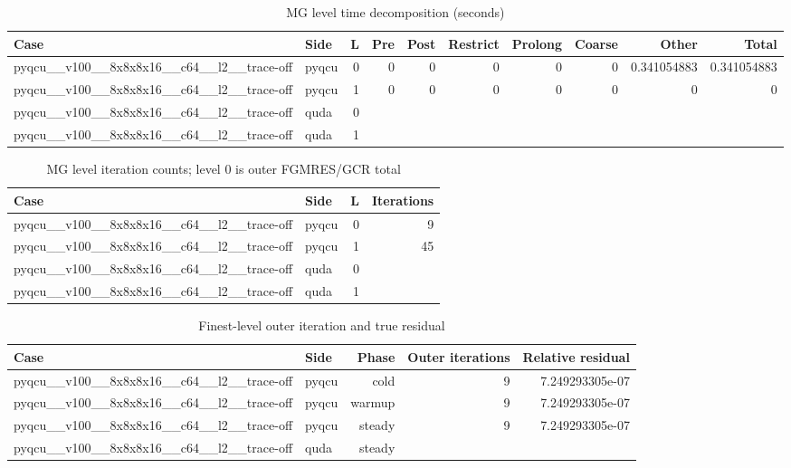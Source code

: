 
\begin{table}[htbp]
\centering
\caption{MG level time decomposition (seconds)}
\small
\begin{tabular}{@{}llrrrrrrrr@{}}
\toprule
Case & Side & L & Pre & Post & Restrict & Prolong & Coarse & Other & Total \\
\midrule
pyqcu\_\_v100\_\_8x8x8x16\_\_c64\_\_l2\_\_trace-off & pyqcu & 0 & 0 & 0 & 0 & 0 & 0 & 0.341054883 & 0.341054883 \\
pyqcu\_\_v100\_\_8x8x8x16\_\_c64\_\_l2\_\_trace-off & pyqcu & 1 & 0 & 0 & 0 & 0 & 0 & 0 & 0 \\
pyqcu\_\_v100\_\_8x8x8x16\_\_c64\_\_l2\_\_trace-off & quda & 0 &  &  &  &  &  &  &  \\
pyqcu\_\_v100\_\_8x8x8x16\_\_c64\_\_l2\_\_trace-off & quda & 1 &  &  &  &  &  &  &  \\
\bottomrule
\end{tabular}
\end{table}

\begin{table}[htbp]
\centering
\caption{MG level iteration counts; level 0 is outer FGMRES/GCR total}
\small
\begin{tabular}{@{}llrr@{}}
\toprule
Case & Side & L & Iterations \\
\midrule
pyqcu\_\_v100\_\_8x8x8x16\_\_c64\_\_l2\_\_trace-off & pyqcu & 0 & 9 \\
pyqcu\_\_v100\_\_8x8x8x16\_\_c64\_\_l2\_\_trace-off & pyqcu & 1 & 45 \\
pyqcu\_\_v100\_\_8x8x8x16\_\_c64\_\_l2\_\_trace-off & quda & 0 &  \\
pyqcu\_\_v100\_\_8x8x8x16\_\_c64\_\_l2\_\_trace-off & quda & 1 &  \\
\bottomrule
\end{tabular}
\end{table}

\begin{table}[htbp]
\centering
\caption{Finest-level outer iteration and true residual}
\small
\begin{tabular}{@{}llrrr@{}}
\toprule
Case & Side & Phase & Outer iterations & Relative residual \\
\midrule
pyqcu\_\_v100\_\_8x8x8x16\_\_c64\_\_l2\_\_trace-off & pyqcu & cold & 9 & 7.249293305e-07 \\
pyqcu\_\_v100\_\_8x8x8x16\_\_c64\_\_l2\_\_trace-off & pyqcu & warmup & 9 & 7.249293305e-07 \\
pyqcu\_\_v100\_\_8x8x8x16\_\_c64\_\_l2\_\_trace-off & pyqcu & steady & 9 & 7.249293305e-07 \\
pyqcu\_\_v100\_\_8x8x8x16\_\_c64\_\_l2\_\_trace-off & quda & steady &  &  \\
\bottomrule
\end{tabular}
\end{table}

